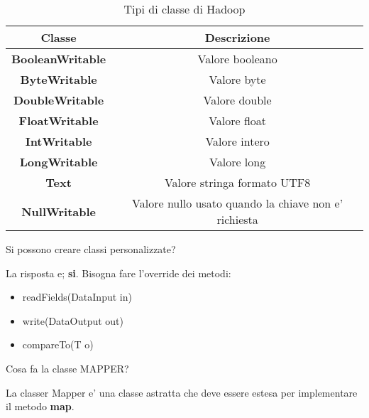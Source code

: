 \begin{table}[H]
    \centering
    \begin{tabular}{|c|c|}
        \hline
        \textbf{Classe}          & \textbf{Descrizione}                                 \\
        \hline
        \textbf{BooleanWritable} & Valore booleano                                      \\
        \hline
        \textbf{ByteWritable}    & Valore byte                                          \\
        \hline
        \textbf{DoubleWritable}  & Valore double                                        \\
        \hline
        \textbf{FloatWritable}   & Valore float                                         \\
        \hline
        \textbf{IntWritable}     & Valore intero                                        \\
        \hline
        \textbf{LongWritable}    & Valore long                                          \\
        \hline
        \textbf{Text}            & Valore stringa formato UTF8                          \\
        \hline
        \textbf{NullWritable}    & Valore nullo usato quando la chiave non e' richiesta \\
        \hline
    \end{tabular}
    \caption{Tipi di classe di Hadoop}
    \label{tab:my_label}
\end{table}

\begin{domanda}
    Si possono creare classi personalizzate?
\end{domanda}

La risposta e; \textbf{si}. Bisogna fare l'override dei metodi:
\begin{itemize}
    \item readFields(DataInput in)
    \item write(DataOutput out)
    \item compareTo(T o)
\end{itemize}

\begin{domanda}
    Cosa fa la classe MAPPER?
\end{domanda}

La classer Mapper e' una classe astratta che deve essere estesa per
implementare il metodo \textbf{map}.

